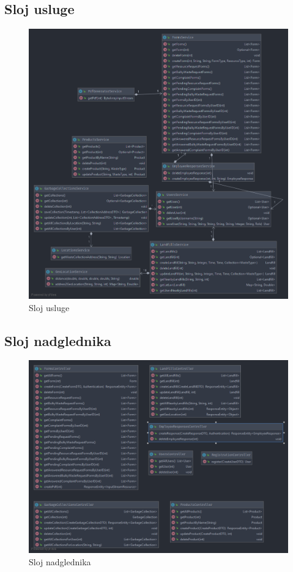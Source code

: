 		\subsection{Sloj usluge}
		\begin{figure}[H]
			\includegraphics[width=\linewidth]{slike/serviceSloj.png}
			\centering
			\caption{Sloj usluge}
			\label{fig:service_sloj}
		\end{figure}
	
		\subsection{Sloj nadglednika}
		\begin{figure}[H]
			\includegraphics[width=\linewidth]{slike/controllersSloj.png}
			\centering
			\caption{Sloj nadglednika}
			\label{fig:controller_sloj}
		\end{figure}
		
